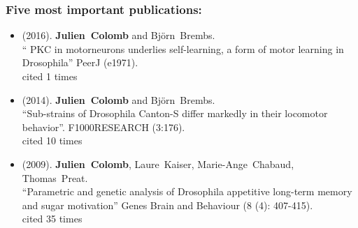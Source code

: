 

\subsubsection{Five most important publications:}
\label{sec:FiveMostImportantPublications}

\begin{sloppypar}
\newcommand{\enquote}[1]{``#1''}
\providecommand{\bibinfo}[2]{#2}
%
%

\begin{itemize}   
 
\item  (\bibinfo{year}{2016}).
  \bibinfo{author}{\textbf{Julien~Colomb}} and \bibinfo{author}{Bj\"{o}rn~Brembs}. \\
\newblock \enquote{\bibinfo{title}{ PKC in motorneurons underlies self-learning, a form of motor learning in Drosophila}}
\newblock \bibinfo{journal}{PeerJ}
  (\bibinfo{pages}{e1971}).
  \\cited 1 times%




 
\item  (\bibinfo{year}{2014}).
  \bibinfo{author}{\textbf{Julien~Colomb}} and \bibinfo{author}{Bj\"{o}rn~Brembs}. \\
\newblock \enquote{\bibinfo{title}{Sub-strains of Drosophila Canton-S differ markedly in their locomotor behavior}}.
\newblock \bibinfo{journal}{F1000RESEARCH}
  (\bibinfo{pages}{3:176}).
  \\cited 10 times%
  

\item   (\bibinfo{year}{2009}).  
 \bibinfo{author}{\textbf{Julien~Colomb}}, \bibinfo{author}{Laure~Kaiser}, \bibinfo{author}{Marie-Ange~Chabaud}, \bibinfo{author}{Thomas~Preat}.
\\
\newblock \enquote{\bibinfo{title}{Parametric and genetic analysis of Drosophila appetitive long-term memory and sugar motivation}}
\newblock \bibinfo{journal}{Genes Brain and Behaviour}
  (\bibinfo{pages}{8 (4): 407-415}).
   \\cited 35 times%
   


\end{itemize}
\end{sloppypar}
